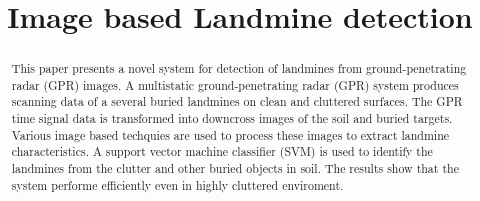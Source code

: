 \documentclass[conference]{IEEEtran}
\begin{document}
\title{Image based Landmine detection}

\author{
\and
{}
}
\maketitle


\begin{abstract}
This paper presents a novel system for detection of landmines from
ground-penetrating radar (GPR) images.  A  multistatic ground-penetrating radar
(GPR) system produces scanning data of a several buried landmines on clean and
cluttered surfaces. The GPR time signal data is transformed into downcross
images of the soil and buried targets. Various image based techquies are used
to process these images to extract landmine characteristics.  A support
vector machine classifier (SVM) is used to identify the landmines from
the clutter and other buried objects in soil. The results show that the system
performe efficiently even in highly cluttered enviroment. %

\end{abstract}





%
\IEEEpeerreviewmaketitle
\end{document}
